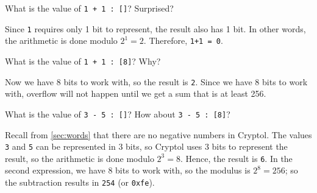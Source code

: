 \begin{Exercise}\label{ex:arith:1}
What is the value of \texttt{1 + 1 :~[\textunderscore]}? Surprised?
\end{Exercise}
\begin{Answer}
  Since {\tt 1} requires only 1 bit to represent, the result also has
  1 bit. In other words, the arithmetic is done modulo $2^1 =
  2$. Therefore, {\tt 1+1 = 0}.
\end{Answer}

\begin{Exercise}\label{ex:arith:2}
What is the value of \texttt{1 + 1 :~[8]}? Why?
\end{Exercise}
\begin{Answer}
  Now we have 8 bits to work with, so the result is {\tt 2}. Since we
  have 8 bits to work with, overflow will not happen until we get a
  sum that is at least 256.
\end{Answer}

\begin{Exercise}\label{ex:arith:3}
What is the value of \texttt{3 - 5 :~[\textunderscore]}? How about \texttt{3 - 5 :~[8]}?
\end{Exercise}
\begin{Answer}
  Recall from \autoref{sec:words} that there are no negative
  numbers in Cryptol. The values \texttt{3} and \texttt{5} can be
  represented in 3 bits, so Cryptol uses 3 bits to represent the
  result, so the arithmetic is done modulo $2^3=8$. Hence, the result
  is \texttt{6}.  In the second expression, we have 8 bits to work with,
  so the modulus is $2^8 = 256$; so the subtraction results in
  \texttt{254} (or \texttt{0xfe}).
\end{Answer}

\indModular\indMinus


